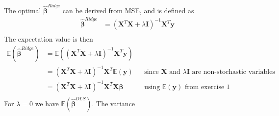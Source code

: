 The optimal $\boldsymbol{\hat{\beta}}^{Ridge}$ can be derived from MSE, and is defined as 
\begin{align*}
    \boldsymbol{\hat{\beta}}^{Ridge} &= (\boldsymbol{X}^{T}\boldsymbol{X} + \lambda \boldsymbol{I})^{-1} \boldsymbol{X}^{T} \boldsymbol{y} \\
\end{align*}
The expectation value is then 
\begin{align*}
    \mathbb{E} (\boldsymbol{\hat{\beta}}^{Ridge}) &= \mathbb{E}((\boldsymbol{X}^{T}\boldsymbol{X} + \lambda \boldsymbol{I})^{-1} \boldsymbol{X}^{T} \boldsymbol{y}) \\
    &= (\boldsymbol{X}^{T}\boldsymbol{X} + \lambda \boldsymbol{I})^{-1} \boldsymbol{X}^{T} \mathbb{E}( \boldsymbol{y} ) && \text{since $\boldsymbol{X}$ and $\lambda \boldsymbol{I}$ are non-stochastic variables} \\
    &= (\boldsymbol{X}^{T}\boldsymbol{X} + \lambda \boldsymbol{I})^{-1} \boldsymbol{X}^{T} \boldsymbol{X} \boldsymbol{\beta} && \text{using $\mathbb{E} (\boldsymbol{y})$ from exercise 1} \\
\end{align*}
For $\lambda = 0$ we have $\mathbb{E} (\boldsymbol{\hat{\beta}}^{OLS})$. The variance 
